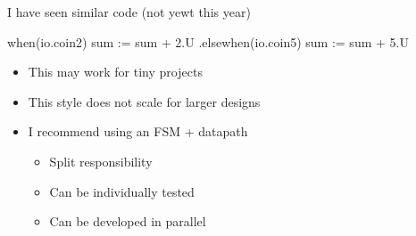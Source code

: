 \begin{frame}[fragile]{I have seen similar code (not yewt this year)}
\begin{chisel}
  when(io.coin2) {
    sum := sum + 2.U
  } .elsewhen(io.coin5) {
    sum := sum + 5.U
  }
\end{chisel}
\begin{itemize}
\item This may work for tiny projects
\item This style does not scale for larger designs
\item I recommend using an FSM + datapath
\begin{itemize}
\item Split responsibility
\item Can be individually tested
\item Can be developed in parallel
\end{itemize}
\end{itemize}
\end{frame}
%
%





